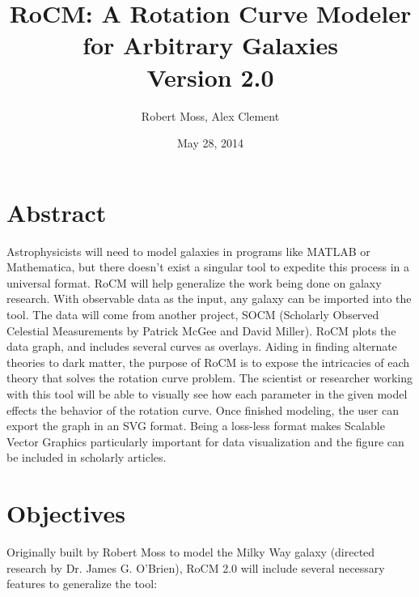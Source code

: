 \documentclass{article}
\title{RoCM: A Rotation Curve Modeler for Arbitrary Galaxies\\\normalsize Version 2.0}
\author{Robert Moss, Alex Clement}
\date{May 28, 2014}%
\begin{document}
\maketitle

\section{Abstract}

Astrophysicists will need to model galaxies in programs like MATLAB or Mathematica, but there doesn't exist a singular tool to expedite this process in a universal format. RoCM will help generalize the work being done on galaxy research.  With observable data as the input, any galaxy can be imported into the tool. The data will come from another project, SOCM (Scholarly Observed Celestial Measurements by Patrick McGee and David Miller). RoCM plots the data graph, and includes several curves as overlays. Aiding in finding alternate theories to dark matter, the purpose of RoCM is to expose the intricacies of each theory that solves the rotation curve problem. The scientist or researcher working with this tool will be able to visually see how each parameter in the given model effects the behavior of the rotation curve. Once finished modeling, the user can export the graph in an SVG format. Being a loss-less format makes Scalable Vector Graphics particularly important for data visualization and the figure can be included in scholarly articles.

\section{Objectives}

Originally built by Robert Moss to model the Milky Way galaxy (directed research by Dr. James G. O'Brien), RoCM 2.0 will include several necessary features to generalize the tool:
\end{document}
